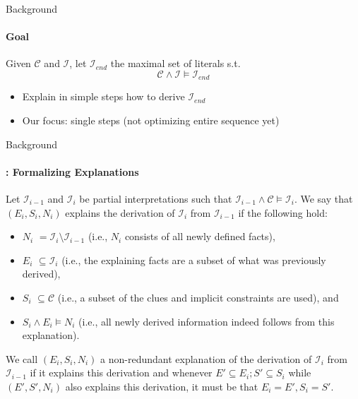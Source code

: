 \documentclass{beamer}
\newcommand\m[1]{\ensuremath{\mathcal{#1}}\xspace}
\renewcommand\emph[1]{{\color{vuborange}#1}}
\newcommand\Iend{\m{I_{\mathit{end}}}}
\begin{document}
	\begin{frame}{Background}
	\framesubtitle{Goal}
	Given $\mathbf{\m{C}}$ and $\mathbf{\m{I}}$, let $\Iend$ the maximal set of literals s.t.
	\[\m{C} \land \m{I} \models \Iend\]
		\begin{itemize}
		    \item Explain in simple steps how to derive \Iend
			\item Our focus: single steps  (not optimizing entire sequence yet)
		\end{itemize}
	\end{frame}

	\begin{frame}{Background}
		\framesubtitle{\cite{bogaerts2020step}: Formalizing Explanations}
		\begin{definition}
			\small
			Let $\m{I}_{i-1}$ and $\m{I}_i$ be partial interpretations such that $\m{I}_{i-1}\wedge \m{C} \models \m{I}_i$.
			We say that $(E_i,S_i,N_i)$ \emph{explains} the derivation of $\m{I}_{i}$ from $\m{I}_{i-1}$ if the following hold:
			\begin{itemize}
				\item \emph{$N_i$} $= \m{I}_i \setminus \m{I}_{i-1}$ (i.e., $N_i$ consists of all newly defined facts), \pause
				\item \emph{$E_i$} $\subseteq \m{I}_i$ (i.e., the explaining facts are a subset of what was previously derived),\pause
				\item \emph{$S_i$} $ \subseteq \m{C}$ (i.e., a subset of the clues and implicit constraints are used), and \pause
				\item \emph{$S_i \land E_i \models N_i$} (i.e., all newly derived information indeed follows from this explanation).
			\end{itemize}
		\end{definition}\pause
			 \begin{definition}
		\small
		We call $(E_i,S_i,N_i)$ a \emph{non-redundant explanation of  the derivation of $\m{I}_i$ from $\m{I}_{i-1}$} if it explains this derivation and whenever $E'\subseteq E_i; S'\subseteq S_i$ while $(E',S',N_i)$ also explains this derivation, it must be that $E_i=E', S_i=S'$. 
	\end{definition}
	\end{frame}
\end{document}
